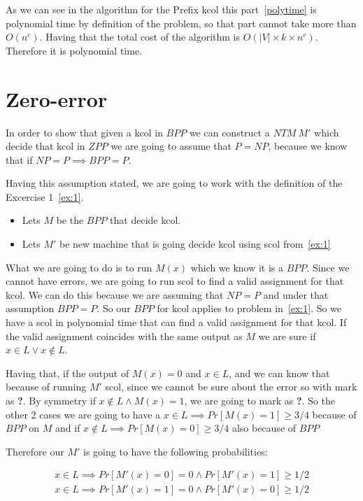 \documentclass[12pt, a4paper]{article}
\begin{document}
As we can see in the algorithm for the Prefix \acrshort{kcol} this part~\ref{polytime} is polynomial time by definition of the problem, so that part cannot take more than $O(n^c)$. Having that the total cost of the algorithm is $O(|V| \times k \times n^c)$. Therefore it is polynomial time.

\section{Zero-error}
In order to show that given a \acrshort{kcol} in $BPP$ we can construct a $NTM\ M'$ which decide that \acrshort{kcol} in $ZPP$ we are going to assume that $P = NP$, because we know that if $NP = P \implies BPP = P$.

Having this assumption stated, we are going to work with the definition of the Excercise 1~\ref{ex:1}.

\begin{itemize}
  \item Lets $M$ be the $BPP$ that decide \acrshort{kcol}.
  \item Lets $M'$ be new machine that is going decide \acrshort{kcol} using \acrshort{scol} from~\ref{ex:1}
\end{itemize}

What we are going to do is to run $M(x)$ which we know it is a $BPP$. Since we cannot have errors, we are going to run \acrshort{scol} to find a valid assignment for that \acrshort{kcol}. We can do this because we are assuming that $NP = P$ and under that assumption $BPP = P$. So our $BPP$ for \acrshort{kcol} applies to problem in~\ref{ex:1}. So we have a \acrshort{scol} in polynomial time that can find a valid assignment for that \acrshort{kcol}. If the valid assignment coincides with the same output as $M$ we are sure if $x \in L \lor x \notin L$.

Having that, if the output of $M(x) = 0$ and $x \in L$, and we can know that because of running $M'$ \acrshort{scol}, since we cannot be sure about the error so with mark as \textbf{?}. By symmetry if $x \notin L \land M(x) = 1$, we are going to mark as \textbf{?}. So the other 2 cases we are going to have a $x \in L \implies Pr[M(x) = 1] \geq 3/4$ because of $BPP$ on $M$ and if $x \notin L \implies Pr[M(x) = 0] \geq 3/4$ also because of $BPP$

Therefore our $M'$ is going to have the following probabilities:

\begin{subequations}
  \begin{align}
  x \in L \implies Pr[M'(x)=0] = 0 \land Pr[M'(x) = 1] \geq 1/2\\
  x \in L \implies Pr[M'(x)=1] = 0 \land Pr[M'(x) = 0] \geq 1/2\\
\end{align}
\end{subequations}
\end{document}
